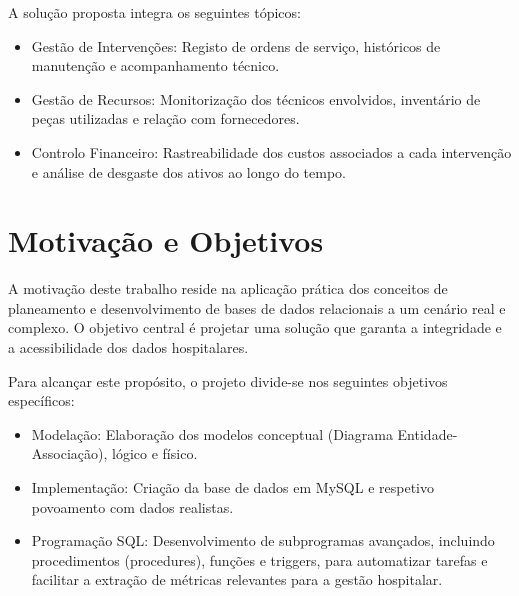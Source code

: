 A solução proposta integra os seguintes tópicos:

\begin{itemize}
    \item Gestão de Intervenções: Registo de ordens de serviço, históricos de manutenção e acompanhamento técnico.
\end{itemize}

\begin{itemize}
    \item Gestão de Recursos: Monitorização dos técnicos envolvidos, inventário de peças utilizadas e relação com fornecedores.
\end{itemize}

\begin{itemize}
    \item Controlo Financeiro: Rastreabilidade dos custos associados a cada intervenção e análise de desgaste dos ativos ao longo do tempo.
\end{itemize}

\section{ Motivação e Objetivos}
A motivação deste trabalho reside na aplicação prática dos conceitos de planeamento e desenvolvimento de bases de dados relacionais a um cenário real e complexo. O objetivo central é projetar uma solução que garanta a integridade e a acessibilidade dos dados hospitalares.

Para alcançar este propósito, o projeto divide-se nos seguintes objetivos específicos:

\begin{itemize}
    \item Modelação: Elaboração dos modelos conceptual (Diagrama Entidade-Associação), lógico e físico.
\end{itemize}

\begin{itemize}
    \item Implementação: Criação da base de dados em MySQL e respetivo povoamento com dados realistas.
\end{itemize}

\begin{itemize}
    \item Programação SQL: Desenvolvimento de subprogramas avançados, incluindo procedimentos (procedures), funções e triggers, para automatizar tarefas e facilitar a extração de métricas relevantes para a gestão hospitalar.
\end{itemize}